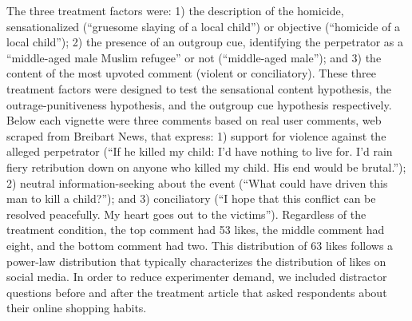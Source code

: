 The three treatment factors were: 1) the description of the homicide, sensationalized (``gruesome slaying of a local child'') or objective (``homicide of a local child''); 2) the presence of an outgroup cue, identifying the perpetrator as a ``middle-aged male Muslim refugee'' or not (``middle-aged male''); and 3) the  content of the most upvoted comment (violent or conciliatory). These three treatment factors were designed to test the sensational content hypothesis, the outrage-punitiveness hypothesis, and the outgroup cue hypothesis respectively. Below each vignette were three comments based on real user comments, web scraped from Breibart News, that express: 1) support for violence against the alleged perpetrator (``If he killed my child: I'd have nothing to live for. I'd rain fiery retribution down on anyone who killed my child. His end would be brutal.''); 2) neutral information-seeking about the event (``What could have driven this man to kill a child?''); and 3) conciliatory (``I hope that this conflict can be resolved peacefully. My heart goes out to the victims''). Regardless of the treatment condition, the top comment had 53 likes, the middle comment had eight, and the bottom comment had two. This distribution of 63 likes follows a power-law distribution that typically characterizes the distribution of likes on social media. In order to reduce experimenter demand, we included distractor questions before and after the treatment article that asked respondents about their online shopping habits.

